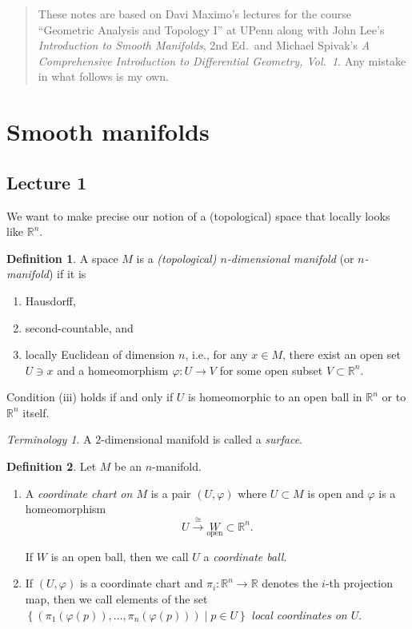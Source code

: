 \documentclass[10pt,letterpaper,cm]{nupset}
\theoremstyle{definition}
\newtheorem{definition}{Definition}[subsection]
\theoremstyle{theorem}
\theoremstyle{remark}
\newtheorem*{term}{Terminology}
\newcommand{\R}{\mathbb R}
\newcommand{\1}{\mathbf{1}}
\newcommand{\0}{\vec 0}
\begin{document}
\thispagestyle{empty}
\begin{abstract}
These notes are based on Davi Maximo's lectures for the course ``Geometric Analysis and Topology I'' at UPenn along with John Lee's \textit{Introduction to Smooth Manifolds}, 2nd Ed.\ and Michael Spivak's \textit{A Comprehensive Introduction to Differential Geometry, Vol.\ 1}. Any mistake in what follows is my own.
\end{abstract}


\tableofcontents
\newpage

\section{Smooth manifolds}

\subsection{Lecture 1}

We want to make precise our notion of a (topological) space that locally looks like $\R^n$.

\theoremstyle{definition}
\begin{definition}{A space $M$ is a \textit{(topological) $n$-dimensional manifold} (or \textit{$n$-manifold}) if it is 
\begin{enumerate}[label=(\roman*)]
\item Hausdorff, 
\item second-countable, and 
\item locally Euclidean of dimension $n$, i.e., for any $x\in M$, there exist an open set $U\ni x$ and a homeomorphism $\varphi : U \to V$ for some open subset $V\subset \R^n$.
\end{enumerate}
}
\end{definition}

Condition (iii) holds if and only if $U$ is homeomorphic to an open ball in $\R^n$ or to $\R^n$ itself.

\smallskip

\begin{term}
A $2$-dimensional manifold is called a \textit{surface}.
\end{term}

\begin{definition} Let $M$ be an $n$-manifold.
\begin{enumerate}
\item  A \textit{coordinate chart on $M$} is a pair $\left(U, \varphi\right)$ where $U\subset M$ is open and $\varphi$ is a homeomorphism $$U \overset{\cong}{\longrightarrow} \underset{\text{open}} W \subset \R^n.$$

If $W$ is an open ball, then we call $U$ a \textit{coordinate ball}.
\item If $\left(U, \varphi\right)$ is a coordinate chart and $\pi_i : \R^n \to \R$ denotes the $i$-th projection map, then we call elements of the set $\left\{\left(\pi_1(\varphi(p)), \ldots, \pi_n(\varphi(p))\right) \mid p \in U\right\}$ \textit{local coordinates on $U$}.
\end{enumerate}
\end{definition}
\end{document}
